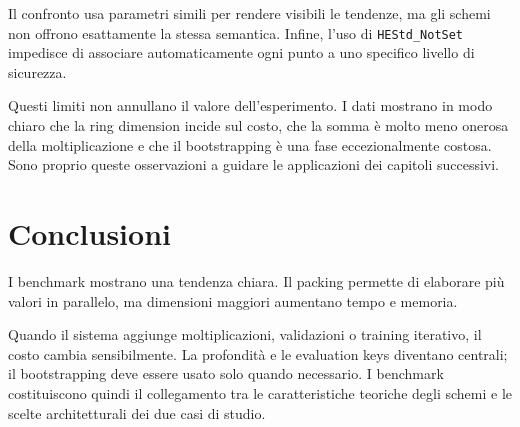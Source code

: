 Il confronto usa parametri simili per rendere visibili le tendenze, ma gli schemi non offrono esattamente la stessa semantica. Infine, l'uso di \texttt{HEStd\_NotSet} impedisce di associare automaticamente ogni punto a uno specifico livello di sicurezza.

Questi limiti non annullano il valore dell'esperimento. I dati mostrano in modo chiaro che la ring dimension incide sul costo, che la somma \`e molto meno onerosa della moltiplicazione e che il bootstrapping \`e una fase eccezionalmente costosa. Sono proprio queste osservazioni a guidare le applicazioni dei capitoli successivi.

\section{Conclusioni}
I benchmark mostrano una tendenza chiara. Il packing permette di elaborare pi\`u valori in parallelo, ma dimensioni maggiori aumentano tempo e memoria.

Quando il sistema aggiunge moltiplicazioni, validazioni o training iterativo, il costo cambia sensibilmente. La profondit\`a e le evaluation keys diventano centrali; il bootstrapping deve essere usato solo quando necessario. I benchmark costituiscono quindi il collegamento tra le caratteristiche teoriche degli schemi e le scelte architetturali dei due casi di studio.
